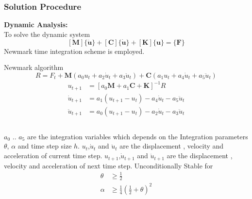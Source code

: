 \documentclass[9pt]{beamer}
\begin{document}
\begin{frame}
\frametitle{Solution Procedure}

\textbf{Dynamic Analysis:}\\
To solve the dynamic system
\begin{equation*}
\left[ \mathbf{M}  \right] 
\{ \ddot{\mathbf{u}} \}
+
\left[ \mathbf{C}  \right] 
\{ \dot{\mathbf{u}} \}
+
\left[ \mathbf{K}  \right] 
\{\mathbf{u} \}
=
\{ \mathbf{F} \}
\end{equation*}
Newmark time integration scheme is employed. 
\begin{block}{Newmark algorithm}
\begin{equation*}
R=F_t + \mathbf{M} \left(a_0 u_{t}+a_2 \dot{u}_{t} + a_3 \ddot{u}_{t} \right) + \mathbf{C} \left(a_1 u_{t}+a_4 \dot{u}_{t} + a_5 \ddot{u}_{t} \right) 
\end{equation*}
\begin{align*}
u_{t+1} & =\left[a_0 \mathbf{M} + a_1 \mathbf{C} + \mathbf{K} \right] ^ {-1} R \\
\dot{u}_{t+1} & =a_1 \left( u_{t+1} - u_{t} \right) - a_4 \dot{u}_t -a_5 \ddot{u}_t \\
\ddot{u}_{t+1} & =a_0 \left( u_{t+1} - u_{t}\right) - a_2 \dot{u}_t -a_3 \ddot{u}_t
\end{align*}
\end{block}
\begin{columns}
$a_0$ .. $a_5$ are the integration variables which depends on the Integration parameters $\theta$, $\alpha$ and time step size $h$. 
$u_t$,$\dot{u}_t$ and $\ddot{u}_t$ are the displacement , velocity and acceleration of current time step. $u_{t+1}$,$\dot{u}_{t+1}$ and $\ddot{u}_{t+1}$ are the displacement , velocity and acceleration of next time step. 
Unconditionally Stable for
\begin{align*}
\theta & \geq \frac{1}{2}  \\
\alpha & \geq \frac{1}{4}\left(\frac{1}{2}+\theta \right)^2
\end{align*}

\end{columns}
\end{frame}
\end{document}
